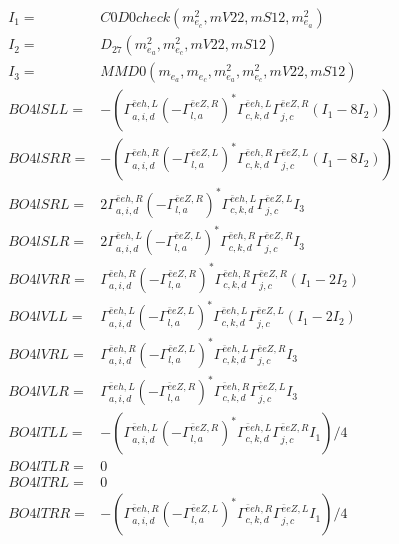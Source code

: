 \documentclass[A4,landscape]{article}
\begin{document}
\begin{align} 
I_1 = & C0D0check(m^2_{e_{{c}}}, mV22, mS12, m^2_{e_{{a}}}) \\ 
I_2 = & D_{27}(m^2_{e_{{a}}}, m^2_{e_{{c}}}, mV22, mS12) \\ 
I_3 = & MMD0(m_{e_{{a}}}, m_{e_{{c}}}, m^2_{e_{{a}}}, m^2_{e_{{c}}}, mV22, mS12) \\ 
  BO4lSLL= & -( \Gamma^{\bar{e}e h ,L}_{a, i, d} (- \Gamma^{\bar{e}e Z ,R} _{l, a})^* \Gamma^{\bar{e}e h ,L}_{c, k, d} \Gamma^{\bar{e}e Z ,R}_{j, c} (I_1 - 8 I_2)) \\ 
  BO4lSRR= & -( \Gamma^{\bar{e}e h ,R}_{a, i, d} (- \Gamma^{\bar{e}e Z ,L} _{l, a})^* \Gamma^{\bar{e}e h ,R}_{c, k, d} \Gamma^{\bar{e}e Z ,L}_{j, c} (I_1 - 8 I_2)) \\ 
  BO4lSRL= & 2  \Gamma^{\bar{e}e h ,R}_{a, i, d} (- \Gamma^{\bar{e}e Z ,R} _{l, a})^* \Gamma^{\bar{e}e h ,L}_{c, k, d} \Gamma^{\bar{e}e Z ,L}_{j, c} I_3 \\ 
  BO4lSLR= & 2  \Gamma^{\bar{e}e h ,L}_{a, i, d} (- \Gamma^{\bar{e}e Z ,L} _{l, a})^* \Gamma^{\bar{e}e h ,R}_{c, k, d} \Gamma^{\bar{e}e Z ,R}_{j, c} I_3 \\ 
  BO4lVRR= &  \Gamma^{\bar{e}e h ,R}_{a, i, d} (- \Gamma^{\bar{e}e Z ,R} _{l, a})^* \Gamma^{\bar{e}e h ,R}_{c, k, d} \Gamma^{\bar{e}e Z ,R}_{j, c} (I_1 - 2 I_2) \\ 
  BO4lVLL= &  \Gamma^{\bar{e}e h ,L}_{a, i, d} (- \Gamma^{\bar{e}e Z ,L} _{l, a})^* \Gamma^{\bar{e}e h ,L}_{c, k, d} \Gamma^{\bar{e}e Z ,L}_{j, c} (I_1 - 2 I_2) \\ 
  BO4lVRL= &  \Gamma^{\bar{e}e h ,R}_{a, i, d} (- \Gamma^{\bar{e}e Z ,L} _{l, a})^* \Gamma^{\bar{e}e h ,L}_{c, k, d} \Gamma^{\bar{e}e Z ,R}_{j, c} I_3 \\ 
  BO4lVLR= &  \Gamma^{\bar{e}e h ,L}_{a, i, d} (- \Gamma^{\bar{e}e Z ,R} _{l, a})^* \Gamma^{\bar{e}e h ,R}_{c, k, d} \Gamma^{\bar{e}e Z ,L}_{j, c} I_3 \\ 
  BO4lTLL= & -( \Gamma^{\bar{e}e h ,L}_{a, i, d} (- \Gamma^{\bar{e}e Z ,R} _{l, a})^* \Gamma^{\bar{e}e h ,L}_{c, k, d} \Gamma^{\bar{e}e Z ,R}_{j, c} I_1)/4 \\ 
  BO4lTLR= & 0 \\ 
  BO4lTRL= & 0 \\ 
  BO4lTRR= & -( \Gamma^{\bar{e}e h ,R}_{a, i, d} (- \Gamma^{\bar{e}e Z ,L} _{l, a})^* \Gamma^{\bar{e}e h ,R}_{c, k, d} \Gamma^{\bar{e}e Z ,L}_{j, c} I_1)/4 \\ 
\end{align} 
\end{document}
